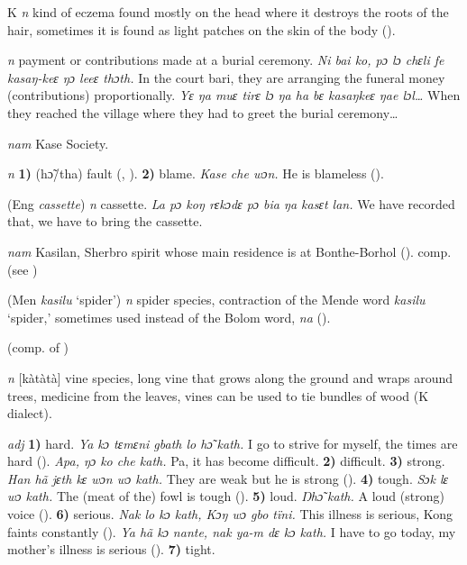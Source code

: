 \begin{letter}{K}
 \textit{n} kind of eczema found mostly on the head where it destroys the roots of the hair, sometimes it is found as light patches on the skin of the body (\citealt{Pichl1967}). 

 \textit{n} payment or contributions made at a burial ceremony. \textit{Ni bai ko, pɔ lɔ chɛli fe kasaŋ-keɛ ŋɔ leeɛ thɔth.} In the court bari, they are arranging the funeral money (contributions) proportionally. \textit{Yɛ ŋa muɛ tirɛ lɔ ŋa ha bɛ kasaŋkeɛ ŋae lɔl…} When they reached the village where they had to greet the burial ceremony…

 \textit{nam} Kase Society. 

 \textit{n} \textbf{1)} (hɔ̃/tha) fault (\citealt{Pichl1967}, \citealt{Sumner1921}). \textbf{2)} blame. \textit{Kase che wɔn.} He is blameless (\citealt{Pichl1967}). 

 (Eng \textit{cassette}) \textit{n} cassette. \textit{La pɔ koŋ rɛkɔdɛ pɔ bia ŋa kasɛt lan.} We have recorded that, we have to bring the cassette.

 \textit{nam} Kasilan, Sherbro spirit whose main residence is at Bonthe-Borhol (\citealt{Pichl1967}). comp.  (see ) 

 (Men \textit{kasilu} ‘spider') \textit{n} spider species, contraction of the Mende word \textit{kasilu} ‘spider,' sometimes used instead of the Bolom word, \textit{na} (\citealt{Pichl1967}).

 (comp. of ) 

 \textit{n} [kàtàtà] vine species, long vine that grows along the ground and wraps around trees, medicine from the leaves, vines can be used to tie bundles of wood (K dialect). 

 \textit{adj} \textbf{1)} hard. \textit{Ya kɔ tɛmɛni gbath lo hɔ̃ kath.} I go to strive for myself, the times are hard (\citealt{Pichl1967}). \textit{Apa, ŋɔ ko che kath.} Pa, it has become difficult. \textbf{2)} difficult. \textbf{3)} strong. \textit{Han hã jɛth kɛ wɔn wɔ kath.} They are weak but he is strong (\citealt{Pichl1967}). \textbf{4)} tough. \textit{Sɔk lɛ wɔ kath.} The (meat of the) fowl is tough (\citealt{Pichl1967}). \textbf{5)} loud. \textit{Ŋhɔ̃ kath.} A loud (strong) voice (\citealt{Pichl1967}). \textbf{6)} serious. \textit{Nak lo kɔ kath, Kɔŋ wɔ gbo tïni.} This illness is serious, Kong faints constantly (\citealt{Pichl1967}). \textit{Ya hã kɔ nante, nak ya-m dɛ kɔ kath.} I have to go today, my mother's illness is serious (\citealt{Pichl1967}). \textbf{7)} tight.


\end{letter}
